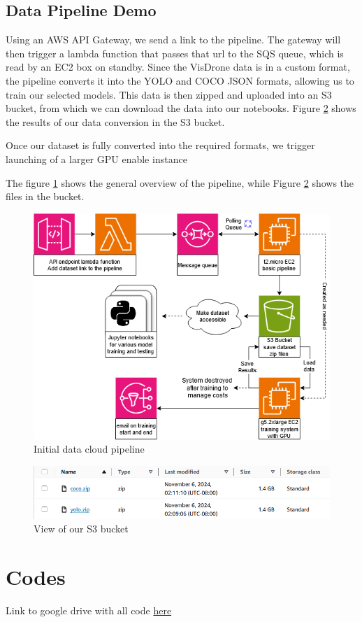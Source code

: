 \documentclass[stu,12pt,floatsintext]{apa7}
\begin{document}
\subsection{Data Pipeline Demo}

Using an AWS API Gateway, we send a link to the  pipeline. The gateway will then trigger a lambda function that passes that url to the SQS queue, which is read by an EC2 box on standby. Since the VisDrone data is in a custom format, the pipeline converts it into the YOLO and COCO JSON formats, allowing us to train our selected models. This data is then zipped and uploaded into an S3 bucket, from which we can download the data into our notebooks. Figure \ref{fig:s3} shows the results of our data conversion in the S3 bucket.

Once our dataset is fully converted into the required formats, we trigger launching of a larger GPU enable instance

The figure \ref{fig:aws-pipeline} shows the general overview of the pipeline, while Figure \ref{fig:s3} shows the files in the bucket.

\begin{figure}[!htb]
	\centering
	\includegraphics[width=0.85\linewidth]{images/AWS_diagram.png}
	\caption{Initial data cloud pipeline}
	\label{fig:aws-pipeline}
\end{figure}

\begin{figure}[!htb]
	\centering
	\includegraphics[width=0.75\linewidth]{images/s3_bucket.png}
	\caption{View of our S3 bucket}
	\label{fig:s3}
\end{figure}

\printbibliography

\appendix

\section{Codes}
Link to google drive with all code \href{https://drive.google.com/drive/folders/1v2ZJgjyh_n74P1Nv9IqH554BLGvzE3JF?usp=drive_link}{\color{blue}here}
\end{document}
